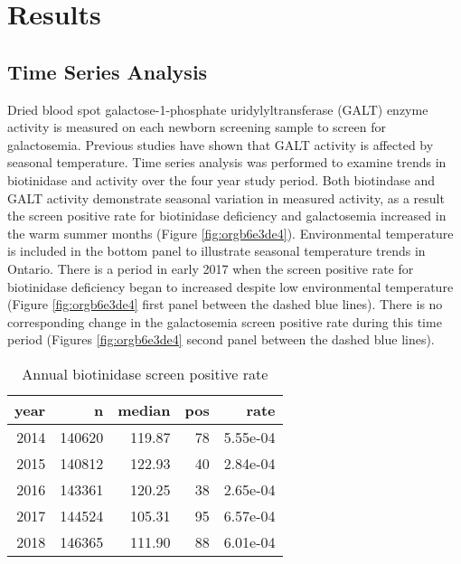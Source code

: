 \documentclass[review]{elsarticle}
\begin{document}
\section*{Results}
\label{sec:org82fb593}
\subsection*{Time Series Analysis}
\label{sec:orgc3ae03d}
Dried blood spot galactose-1-phosphate uridylyltransferase (GALT)
enzyme activity is measured on each newborn screening sample to screen
for galactosemia. Previous studies have shown that GALT activity is
affected by seasonal temperature. Time series analysis was performed
to examine trends in biotinidase and activity over the four year study
period. Both biotindase and GALT activity demonstrate seasonal
variation in measured activity, as a result the screen positive rate
for biotinidase deficiency and galactosemia increased in the warm
summer months (Figure \ref{fig:orgb6e3de4}). Environmental temperature is
included in the bottom panel to illustrate seasonal temperature trends
in Ontario. There is a period in early 2017 when the screen positive
rate for biotinidase deficiency began to increased despite low
environmental temperature (Figure \ref{fig:orgb6e3de4} first panel between the
dashed blue lines). There is no corresponding change in the
galactosemia screen positive rate during this time period (Figures
\ref{fig:orgb6e3de4} second panel between the dashed blue lines).

\begin{table}[ht]
\centering
\begin{tabular}{rrrrr}
  \hline
year & n & median & pos & rate \\ 
  \hline
2014 & 140620 & 119.87 &  78 & 5.55e-04 \\ 
  2015 & 140812 & 122.93 &  40 & 2.84e-04 \\ 
  2016 & 143361 & 120.25 &  38 & 2.65e-04 \\ 
  2017 & 144524 & 105.31 &  95 & 6.57e-04 \\ 
  2018 & 146365 & 111.90 &  88 & 6.01e-04 \\ 
   \hline
\end{tabular}
\caption{Annual biotinidase screen positive rate} 
\label{tab:biot_year}
\end{table}
\end{document}
